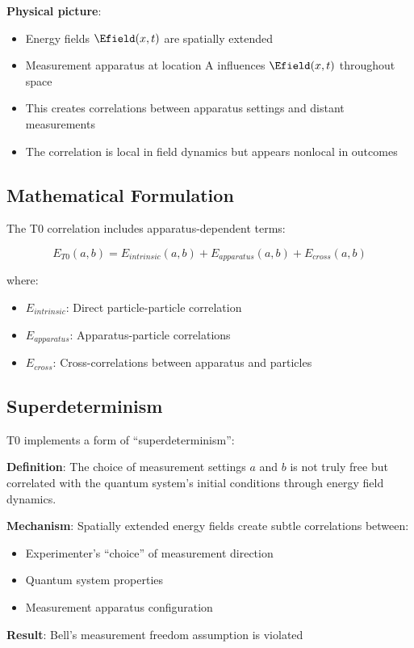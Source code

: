 	\textbf{Physical picture}:
	\begin{itemize}
		\item Energy fields $\Efield(x,t)$ are spatially extended
		\item Measurement apparatus at location A influences $\Efield(x,t)$ throughout space
		\item This creates correlations between apparatus settings and distant measurements
		\item The correlation is local in field dynamics but appears nonlocal in outcomes
	\end{itemize}
	
	\subsection{Mathematical Formulation}
	
	The T0 correlation includes apparatus-dependent terms:
	
	\begin{equation}
		E_{T0}(a,b) = E_{intrinsic}(a,b) + E_{apparatus}(a,b) + E_{cross}(a,b)
	\end{equation}
	
	where:
	\begin{itemize}
		\item $E_{intrinsic}$: Direct particle-particle correlation
		\item $E_{apparatus}$: Apparatus-particle correlations
		\item $E_{cross}$: Cross-correlations between apparatus and particles
	\end{itemize}
	
	\subsection{Superdeterminism}
	
	T0 implements a form of ``superdeterminism'':
	
	\begin{tcolorbox}[colback=blue!5!white,colframe=blue!75!black,title=T0 Superdeterminism]
		\textbf{Definition}: The choice of measurement settings $a$ and $b$ is not truly free but correlated with the quantum system's initial conditions through energy field dynamics.
		
		\textbf{Mechanism}: Spatially extended energy fields create subtle correlations between:
		\begin{itemize}
			\item Experimenter's ``choice'' of measurement direction
			\item Quantum system properties
			\item Measurement apparatus configuration
		\end{itemize}
		
		\textbf{Result}: Bell's measurement freedom assumption is violated
	\end{tcolorbox}
	

